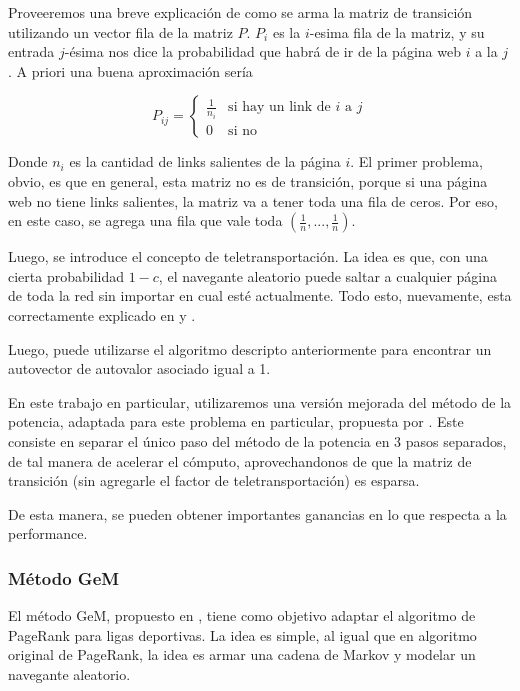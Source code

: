 Proveeremos una breve explicación de como se arma la matriz de transición utilizando un vector fila de la matriz $P$. 
$P_i$ es la $i$-esima fila de la matriz, y su entrada $j$-ésima nos dice la probabilidad que habrá de ir de la página web $i$ a la $j$. A priori una buena aproximación sería

\[ P_{ij} = \begin{cases} 
      \frac{1}{n_i} & \text{si hay un link de $i$ a $j$} \\
       0 & \text{si no}
   \end{cases}
\] 

Donde $n_i$ es la cantidad de links salientes de la página $i$.
El primer problema, obvio, es que en general, esta matriz no es de transición, porque si una página web no tiene links salientes, la matriz va a tener toda una fila de ceros. Por eso, en este caso, se agrega una fila que vale toda $(\frac1n, ..., \frac1n)$.

Luego, se introduce el concepto de teletransportación. La idea es que, con una cierta probabilidad $1-c$, el navegante aleatorio puede saltar a cualquier página de toda la red sin importar en cual esté actualmente. Todo esto, nuevamente, esta correctamente explicado en \cite{Brin1998} y \cite{Kamvar2003}.

Luego, puede utilizarse el algoritmo descripto anteriormente para encontrar un autovector de autovalor asociado igual a 1.

En este trabajo en particular, utilizaremos una versión mejorada del m\'etodo de la potencia, adaptada para este problema en particular, propuesta por \cite{Kamvar2003}. Este consiste en separar el único paso del método de la potencia en 3 pasos separados, de tal manera de acelerar el cómputo, aprovechandonos de que la matriz de transición (sin agregarle el factor de teletransportación) es esparsa.

De esta manera, se pueden obtener importantes ganancias en lo que respecta a la performance.

\subsubsection{Método GeM}

El método GeM, propuesto en \cite{Govan2008}, tiene como objetivo adaptar el algoritmo de PageRank para ligas deportivas. La idea es simple, al igual que en algoritmo original de PageRank, la idea es armar una cadena de Markov y modelar un navegante aleatorio.


